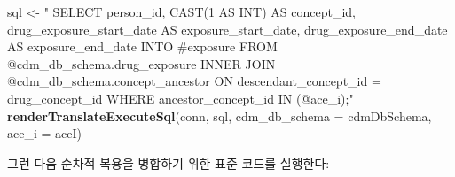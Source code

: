 \documentclass[11pt]{book}
\newenvironment{Shaded}{\begin{snugshade}}{\end{snugshade}}
\newcommand{\KeywordTok}[1]{\textcolor[rgb]{0.13,0.29,0.53}{\textbf{#1}}}
\newcommand{\DataTypeTok}[1]{\textcolor[rgb]{0.13,0.29,0.53}{#1}}
\newcommand{\StringTok}[1]{\textcolor[rgb]{0.31,0.60,0.02}{#1}}
\newcommand{\NormalTok}[1]{#1}
\theoremstyle{definition}
\theoremstyle{definition}
\theoremstyle{definition}
\theoremstyle{remark}
\begin{document}
\begin{Shaded}
\begin{Highlighting}[]
\NormalTok{sql <-}\StringTok{ "}
\StringTok{  SELECT person_id,}
\StringTok{    CAST(1 AS INT) AS concept_id,}
\StringTok{    drug_exposure_start_date AS exposure_start_date,}
\StringTok{    drug_exposure_end_date AS exposure_end_date}
\StringTok{  INTO #exposure}
\StringTok{  FROM @cdm_db_schema.drug_exposure}
\StringTok{  INNER JOIN @cdm_db_schema.concept_ancestor}
\StringTok{    ON descendant_concept_id = drug_concept_id}
\StringTok{  WHERE ancestor_concept_id IN (@ace_i);"}
\KeywordTok{renderTranslateExecuteSql}\NormalTok{(conn,}
\NormalTok{                          sql,}
                          \DataTypeTok{cdm_db_schema =}\NormalTok{ cdmDbSchema,}
                          \DataTypeTok{ace_i =}\NormalTok{ aceI)}
\end{Highlighting}
\end{Shaded}

그런 다음 순차적 복용을 병합하기 위한 표준 코드를 실행한다:
\end{document}
